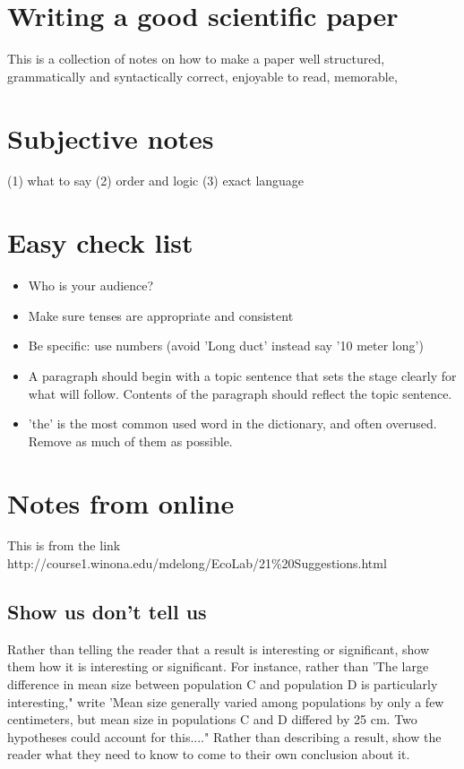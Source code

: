 \documentclass[11pt]{article}
\begin{document}
\doublespacing
\MOONSTITLE
\maketitle

\section{Writing a good scientific paper}
This is a collection of notes on how to make a paper well structured, grammatically and syntactically correct, enjoyable to read, memorable,

\section{Subjective notes}
(1) what to say
(2) order and logic
(3) exact language


\section{Easy check list}
\begin{itemize}
\item Who is your audience?
\item Make sure tenses are appropriate and consistent
\item Be specific: use numbers (avoid 'Long duct' instead say '10 meter long')
\item A paragraph should begin with a topic sentence that sets the stage clearly for what will follow. Contents of the paragraph should reflect the topic sentence.
\item 'the' is the most common used word in the dictionary, and often overused. Remove as much of them as possible.
\end{itemize}

\section{Notes from online}
This is from the link
http://course1.winona.edu/mdelong/EcoLab/21\%20Suggestions.html

\subsection{Show us don't tell us}
Rather than telling the reader that a result is interesting or significant, show them how it is interesting or significant. For instance, rather than 'The large difference in mean size between population C and population D is particularly interesting," write 'Mean size generally varied among populations by only a few centimeters, but mean size in populations C and D differed by 25 cm. Two hypotheses could account for this...." Rather than describing a result, show the reader what they need to know to come to their own conclusion about it.
\end{document}
